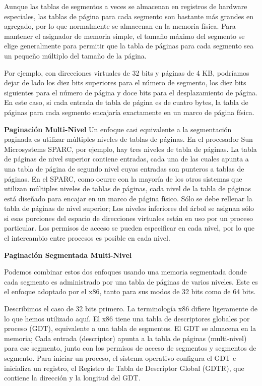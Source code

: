 \documentclass[10pt]{book}
\begin{document}
Aunque las tablas de segmentos a veces se almacenan en registros de hardware especiales, las tablas de página para cada segmento son bastante más grandes en agregado, por lo que normalmente se almacenan en la memoria física. Para mantener el asignador de memoria simple, el tamaño máximo del segmento se elige generalmente para permitir que la tabla de páginas para cada segmento sea un pequeño múltiplo del tamaño de la página.

Por ejemplo, con direcciones virtuales de 32 bits y páginas de 4 KB, podríamos dejar de lado los diez bits superiores para el número de segmento, los diez bits siguientes para el número de página y doce bits para el desplazamiento de página. En este caso, si cada entrada de tabla de página es de cuatro bytes, la tabla de páginas para cada segmento encajaría exactamente en un marco de página física.

\textbf{Paginación Multi-Nivel}
Un enfoque casi equivalente a la segmentación paginada es utilizar múltiples niveles de tablas de páginas. En el procesador Sun Microsystems SPARC, por ejemplo, hay tres niveles de tabla de páginas. La tabla de páginas de nivel superior contiene entradas, cada una de las cuales apunta a una tabla de página de segundo nivel cuyas entradas son punteros a tablas de páginas. En el SPARC, como ocurre con la mayoría de los otros sistemas que utilizan múltiples niveles de tablas de páginas, cada nivel de la tabla de páginas está diseñado para encajar en un marco de página físico. Sólo se debe rellenar la tabla de páginas de nivel superior; Los niveles inferiores del árbol se asignan sólo si esas porciones del espacio de direcciones virtuales están en uso por un proceso particular. Los permisos de acceso se pueden especificar en cada nivel, por lo que el intercambio entre procesos es posible en cada nivel.

\textbf{Paginación Segmentada Multi-Nivel}

Podemos combinar estos dos enfoques usando una memoria segmentada donde cada segmento es administrado por una tabla de páginas de varios niveles. Este es el enfoque adoptado por el x86, tanto para sus modos de 32 bits como de 64 bits.

Describimos el caso de 32 bits primero. La terminología x86 difiere ligeramente de lo que hemos utilizado aquí. El x86 tiene una tabla de descriptores globales por proceso (GDT), equivalente a una tabla de segmentos. El GDT se almacena en la memoria; Cada entrada (descriptor) apunta a la tabla de páginas (multi-nivel) para ese segmento, junto con los permisos de acceso de segmentos y segmentos de segmento. Para iniciar un proceso, el sistema operativo configura el GDT e inicializa un registro, el Registro de Tabla de Descriptor Global (GDTR), que contiene la dirección y la longitud del GDT.
\end{document}
